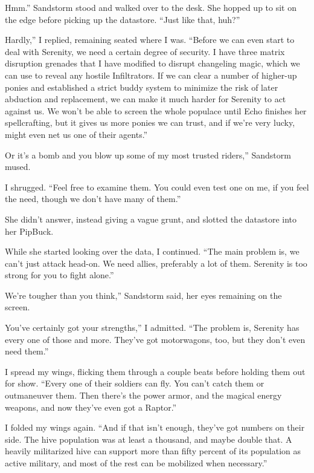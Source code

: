 \leavevmode{}Hmm.” Sandstorm stood and walked over to the desk. She hopped up to sit on the edge before picking up the datastore. “Just like that, huh?”

\leavevmode{}Hardly,” I replied, remaining seated where I was. “Before we can even start to deal with Serenity, we need a certain degree of security. I have three matrix disruption grenades that I have modified to disrupt changeling magic, which we can use to reveal any hostile Infiltrators. If we can clear a number of higher-up ponies and established a strict buddy system to minimize the risk of later abduction and replacement, we can make it much harder for Serenity to act against us. We won’t be able to screen the whole populace until Echo finishes her spellcrafting, but it gives us more ponies we can trust, and if we’re very lucky, might even net us one of their agents.”

\leavevmode{}Or it’s a bomb and you blow up some of my most trusted riders,” Sandstorm mused.

I shrugged. “Feel free to examine them. You could even test one on me, if you feel the need, though we don’t have many of them.”

She didn’t answer, instead giving a vague grunt, and slotted the datastore into her PipBuck.

While she started looking over the data, I continued. “The main problem is, we can’t just attack head-on. We need allies, preferably a lot of them. Serenity is too strong for you to fight alone.”

\leavevmode{}We’re tougher than you think,” Sandstorm said, her eyes remaining on the screen.

\leavevmode{}You’ve certainly got your strengths,” I admitted. “The problem is, Serenity has every one of those and more. They’ve got motorwagons, too, but they don’t even need them.”

I spread my wings, flicking them through a couple beats before holding them out for show. “Every one of their soldiers can fly. You can’t catch them or outmaneuver them. Then there’s the power armor, and the magical energy weapons, and now they’ve even got a Raptor.”

I folded my wings again. “And if that isn’t enough, they’ve got numbers on their side. The hive population was at least a thousand, and maybe double that. A heavily militarized hive can support more than fifty percent of its population as active military, and most of the rest can be mobilized when necessary.”

